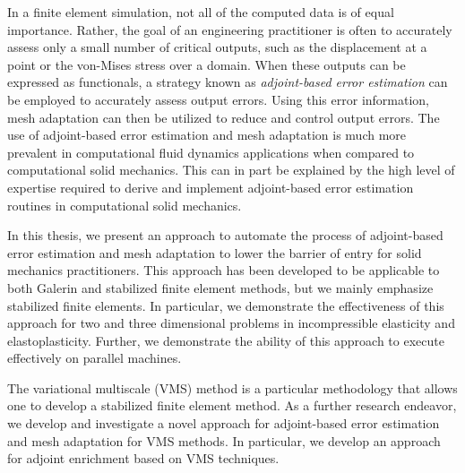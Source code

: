 
In a finite element simulation, not all of the computed
data is of equal importance. Rather, the goal of an engineering
practitioner is often to accurately assess only a small
number of critical outputs, such as the displacement
at a point or the von-Mises stress over a domain. When
these outputs can be expressed as functionals,
a strategy known as \emph{adjoint-based error estimation}
can be employed to accurately assess output errors.
Using this error information, mesh adaptation can then
be utilized to reduce and control output errors.
The use of adjoint-based error estimation and mesh adaptation
is much more prevalent in computational fluid dynamics
applications when compared to computational solid mechanics.
This can in part be explained by the high level of expertise
required to derive and implement adjoint-based error estimation
routines in computational solid mechanics.

In this thesis, we present an approach to automate
the process of adjoint-based error estimation and mesh
adaptation to lower the barrier of entry for solid
mechanics practitioners. This approach has been developed
to be applicable to both Galerin and stabilized finite
element methods, but we mainly emphasize stabilized finite
elements. In particular, we demonstrate the
effectiveness of this approach for two and three
dimensional problems in incompressible elasticity and
elastoplasticity. Further, we demonstrate the ability
of this approach to execute effectively on parallel
machines.

The variational multiscale (VMS) method is a particular
methodology that allows one to develop a stabilized
finite element method. As a further research endeavor,
we develop and investigate a novel approach for
adjoint-based error estimation and mesh adaptation
for VMS methods. In particular, we develop an approach
for adjoint enrichment based on VMS techniques.
